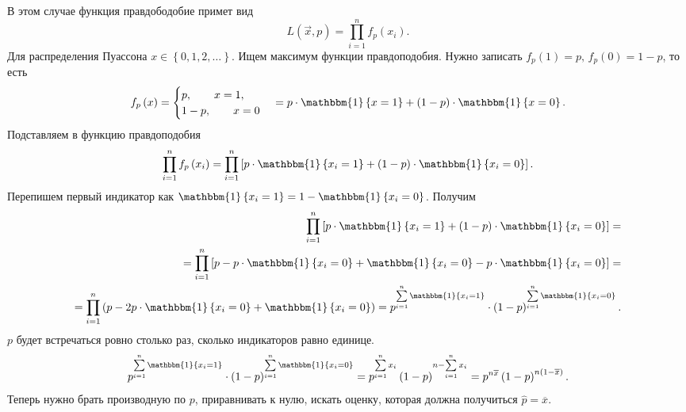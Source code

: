 В этом случае функция правдободобие примет вид
$$L \left( \vec{x}, p \right) =
  \prod \limits_{i = 1}^n f_p \left( x_i \right).$$
Для распределения Пуассона $x \in \left\{ 0, 1, 2, \dotsc \right\} $.
Ищем максимум функции правдоподобия.
Нужно записать $f_p \left( 1 \right) = p, \, f_p \left( 0 \right) = 1 - p$, то есть
$$f_p \left( x \right) =
  \begin{cases}
    p, \qquad x = 1, \\
    1 - p, \qquad x = 0
  \end{cases} =
  p \cdot \mathbbm{1} \left\{ x = 1 \right\} +
  \left( 1 - p \right) \cdot \mathbbm{1} \left\{ x = 0 \right\}.$$
Подставляем в функцию правдоподобия
$$ \prod \limits_{i = 1}^n f_p \left( x_i \right) =
  \prod \limits_{i = 1}^n \left[ p \cdot \mathbbm{1} \left\{ x_i = 1 \right\} +
  \left( 1 - p \right) \cdot \mathbbm{1} \left\{ x_i = 0 \right\} \right].$$
Перепишем первый индикатор как
$ \mathbbm{1} \left\{ x_i = 1 \right\} =
  1 - \mathbbm{1} \left\{ x_i = 0 \right\} $.
Получим
\begin{equation*}
  \begin{split}
    \prod \limits_{i = 1}^n \left[ p \cdot \mathbbm{1} \left\{ x_i = 1 \right\} +
    \left( 1 - p \right) \cdot \mathbbm{1} \left\{ x_i = 0 \right\} \right] = \\
    = \prod \limits_{i = 1}^n
      \left[
        p -
        p \cdot \mathbbm{1} \left\{ x_i = 0 \right\} +
        \mathbbm{1} \left\{ x_i = 0 \right\} -
        p \cdot \mathbbm{1} \left\{ x_i = 0 \right\}
      \right] = \\
    = \prod \limits_{i = 1}^n
      \left(
        p - 2p \cdot \mathbbm{1} \left\{ x_i = 0 \right\} + \mathbbm{1} \left\{ x_i = 0 \right\}
      \right) =
    p^{ \sum \limits_{i = 1}^n \mathbbm{1} \left\{ x_i = 1 \right\} } \cdot
    \left( 1 - p \right)^{ \sum \limits_{i = 1}^n \mathbbm{1} \left\{ x_i = 0 \right\} }.
  \end{split}
\end{equation*}
$p$ будет встречаться ровно столько раз, сколько индикаторов равно единице.
$$p^{ \sum \limits_{i = 1}^n \mathbbm{1} \left\{ x_i = 1 \right\} } \cdot
  \left( 1 - p \right)^{ \sum \limits_{i = 1}^n \mathbbm{1} \left\{ x_i = 0 \right\} } =
  p^{ \sum \limits_{i = 1}^n x_i} \left( 1 - p \right)^{n - \sum \limits_{i = 1}^n x_i} =
  p^{n \overline{x}} \left( 1 - p \right)^{n \left( 1 - \overline{x} \right) }.$$
Теперь нужно брать производную по $p$, приравнивать к нулю, искать оценку,
которая должна получиться $ \hat{p} = \overline{x}$.

